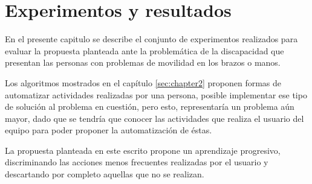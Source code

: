 \chapter{Experimentos y resultados}
\label{sec:chapter5}

En el presente capitulo se describe el conjunto de experimentos realizados
 para evaluar la propuesta planteada ante la problem\'atica de la discapacidad 
 que presentan las personas con problemas de movilidad en los brazos o manos.



Los algoritmos mostrados en el cap\'itulo \ref{sec:chapter2} proponen formas
 de automatizar actividades realizadas por una persona,   posible 
 implementar ese tipo de soluci\'on al problema en cuesti\'on, pero esto, 
 representar\'ia un problema a\'un mayor, dado que se tendr\'ia que conocer 
 las actividades que realiza el usuario del equipo para poder proponer la 
 automatizaci\'on de \'estas. 


La propuesta planteada en este escrito propone un aprendizaje progresivo,
 discriminando las acciones menos frecuentes realizadas por el usuario y 
 descartando por completo aquellas que no se realizan.


\newpage



